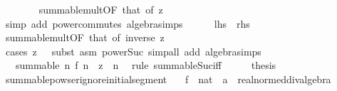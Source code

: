 \begin{isabellebody}
\ \ \ \ \ \ \isamarkupfalse%
\ summable{\isacharunderscore}{\kern0pt}mult{}{\isacharbrackleft}{\kern0pt}OF\ that{\isacharcomma}{\kern0pt}\ of\ z{\isacharbrackright}{\kern0pt}\isanewline
\ \ \ \ \ \ \isamarkupfalse%
\ {\isacharparenleft}{\kern0pt}simp\ add{\isacharcolon}{\kern0pt}\ power{\isacharunderscore}{\kern0pt}commutes\ algebra{\isacharunderscore}{\kern0pt}simps{\isacharparenright}{\kern0pt}\isanewline
\ \ \ \ \isamarkupfalse%
\ {\isacharquery}{\kern0pt}lhs\ \ {\isacharquery}{\kern0pt}rhs\isanewline
\ \ \ \ \ \ \isamarkupfalse%
\ summable{\isacharunderscore}{\kern0pt}mult{}{\isacharbrackleft}{\kern0pt}OF\ that{\isacharcomma}{\kern0pt}\ of\ {\isachardoublequoteopen}inverse\ z{\isachardoublequoteclose}{\isacharbrackright}{\kern0pt}\isanewline
\ \ \ \ \ \ \isamarkupfalse%
\ {\isacharparenleft}{\kern0pt}cases\ {\isachardoublequoteopen}z\ {\isasymnoteq}\ {}{\isachardoublequoteclose}{\isacharcomma}{\kern0pt}\ subst\ {\isacharparenleft}{\kern0pt}asm{\isacharparenright}{\kern0pt}\ power{\isacharunderscore}{\kern0pt}Suc{}{\isacharparenright}{\kern0pt}\ {\isacharparenleft}{\kern0pt}simp{\isacharunderscore}{\kern0pt}all\ add{\isacharcolon}{\kern0pt}\ algebra{\isacharunderscore}{\kern0pt}simps{\isacharparenright}{\kern0pt}\isanewline
\ \ \isamarkupfalse%
\isanewline
\ \ \isamarkupfalse%
\ \isamarkupfalse%
\ {\isachardoublequoteopen}{\isasymdots}\ {\isasymlongleftrightarrow}\ summable\ {\isacharparenleft}{\kern0pt}{\isasymlambda}n{\isachardot}{\kern0pt}\ f\ n\ {\isacharasterisk}{\kern0pt}\ z\ {\isacharcircum}{\kern0pt}\ n{\isacharparenright}{\kern0pt}{\isachardoublequoteclose}\ \isamarkupfalse%
\ {\isacharparenleft}{\kern0pt}rule\ summable{\isacharunderscore}{\kern0pt}Suc{\isacharunderscore}{\kern0pt}iff{\isacharparenright}{\kern0pt}\isanewline
\ \ \isamarkupfalse%
\ \isamarkupfalse%
\ {\isacharquery}{\kern0pt}thesis\ \isacommand{{\isachardot}{\kern0pt}}\isamarkupfalse%
\isanewline
{}\isamarkupfalse%
%
\endisatagproof
{\isafoldproof}%
%
\isadelimproof
\isanewline
%
\endisadelimproof
\isanewline
{}\isamarkupfalse%
\ summable{\isacharunderscore}{\kern0pt}powser{\isacharunderscore}{\kern0pt}ignore{\isacharunderscore}{\kern0pt}initial{\isacharunderscore}{\kern0pt}segment{\isacharcolon}{\kern0pt}\isanewline
\ \ \ f\ {\isacharcolon}{\kern0pt}{\isacharcolon}{\kern0pt}\ {\isachardoublequoteopen}nat\ {\isasymRightarrow}\ {\isacharprime}{\kern0pt}a\ {\isacharcolon}{\kern0pt}{\isacharcolon}{\kern0pt}\ real{\isacharunderscore}{\kern0pt}normed{\isacharunderscore}{\kern0pt}div{\isacharunderscore}{\kern0pt}algebra{\isachardoublequoteclose}\isanewline

\end{isabellebody}
